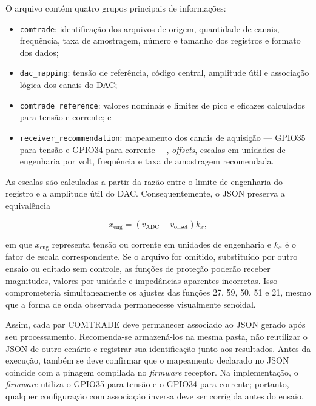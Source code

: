 O arquivo contém quatro grupos principais de informações:

\begin{itemize}
  \item \texttt{comtrade}: identificação dos arquivos de origem, quantidade de canais, frequência, taxa de amostragem, número e tamanho dos registros e formato dos dados;
  \item \texttt{dac\_mapping}: tensão de referência, código central, amplitude útil e associação lógica dos canais do DAC;
  \item \texttt{comtrade\_reference}: valores nominais e limites de pico e eficazes calculados para tensão e corrente; e
  \item \texttt{receiver\_recommendation}: mapeamento dos canais de aquisição --- GPIO35 para tensão e GPIO34 para corrente ---, \textit{offsets}, escalas em unidades de engenharia por volt, frequência e taxa de amostragem recomendada.
\end{itemize}

As escalas são calculadas a partir da razão entre o limite de engenharia do registro e a amplitude útil do DAC. Consequentemente, o JSON preserva a equivalência

\begin{equation}
  x_{\mathrm{eng}}=(v_{\mathrm{ADC}}-v_{\mathrm{offset}})k_x,
\end{equation}

em que $x_{\mathrm{eng}}$ representa tensão ou corrente em unidades de engenharia e $k_x$ é o fator de escala correspondente. Se o arquivo for omitido, substituído por outro ensaio ou editado sem controle, as funções de proteção poderão receber magnitudes, valores por unidade e impedâncias aparentes incorretas. Isso comprometeria simultaneamente os ajustes das funções 27, 59, 50, 51 e 21, mesmo que a forma de onda observada permanecesse visualmente senoidal.

Assim, cada par COMTRADE deve permanecer associado ao JSON gerado após seu processamento. Recomenda-se armazená-los na mesma pasta, não reutilizar o JSON de outro cenário e registrar sua identificação junto aos resultados. Antes da execução, também se deve confirmar que o mapeamento declarado no JSON coincide com a pinagem compilada no \textit{firmware} receptor. Na implementação, o \textit{firmware}  utiliza o GPIO35 para tensão e o GPIO34 para corrente; portanto, qualquer configuração com associação inversa deve ser corrigida antes do ensaio.

